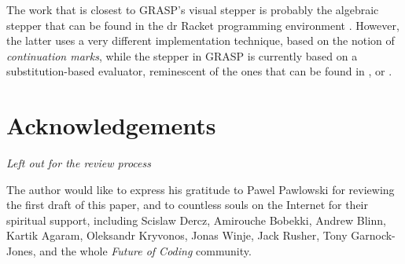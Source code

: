 \documentclass[acmsmall]{acmart}
\begin{document}
The work that is closest to GRASP's visual stepper is probably the
algebraic stepper that can be found in the dr Racket programming
environment \cite{Clements}. However, the latter uses a very different
implementation technique, based on the notion of \textit{continuation
  marks}, while the stepper in GRASP is currently based on a
substitution-based evaluator, reminescent of the ones that can be
found in \cite{Maritime}, \cite{Meyer} or \cite{Pedersen}.

\section*{Acknowledgements}

\textit{Left out for the review process}

The author would like to express his gratitude to Pawel Pawlowski for
reviewing the first draft of this paper, and to countless souls on the
Internet for their spiritual support, including Scislaw Dercz,
Amirouche Bobekki, Andrew Blinn, Kartik Agaram, Oleksandr Kryvonos,
Jonas Winje, Jack Rusher, Tony Garnock-Jones, and the whole
\textit{Future of Coding} community.
\end{document}
